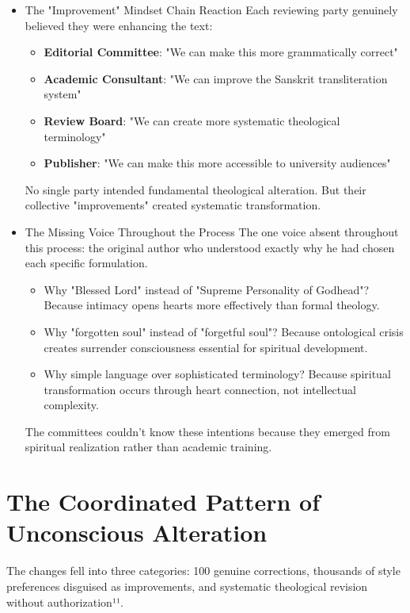 \documentclass[11pt,twoside]{book}
\begin{document}
\begin{itemize}
\item The "Improvement" Mindset Chain Reaction
\label{sec:org38a1ae4}
Each reviewing party genuinely believed they were enhancing the text:

\begin{itemize}
\item \textbf{\textbf{Editorial Committee}}: "We can make this more grammatically correct"
\item \textbf{\textbf{Academic Consultant}}: "We can improve the Sanskrit transliteration system"
\item \textbf{\textbf{Review Board}}: "We can create more systematic theological terminology"
\item \textbf{\textbf{Publisher}}: "We can make this more accessible to university audiences"
\end{itemize}

No single party intended fundamental theological alteration. But their collective "improvements" created systematic transformation.
\item The Missing Voice Throughout the Process
\label{sec:orgb94db17}
The one voice absent throughout this process: the original author who understood exactly why he had chosen each specific formulation.

\begin{itemize}
\item Why "Blessed Lord" instead of "Supreme Personality of Godhead"? Because intimacy opens hearts more effectively than formal theology.
\item Why "forgotten soul" instead of "forgetful soul"? Because ontological crisis creates surrender consciousness essential for spiritual development.
\item Why simple language over sophisticated terminology? Because spiritual transformation occurs through heart connection, not intellectual complexity.
\end{itemize}

The committees couldn't know these intentions because they emerged from spiritual realization rather than academic training.
\end{itemize}
\section*{The Coordinated Pattern of Unconscious Alteration}
\label{sec:org2665715}

The changes fell into three categories: 100 genuine corrections, thousands of style preferences disguised as improvements, and systematic theological revision without authorization¹¹.
\end{document}
